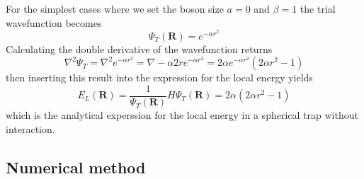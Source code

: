 \documentclass[12pt]{article}
\begin{document}
  For the simplest cases where we set the boson size $a = 0$ and $\beta = 1$ the 
  trial wavefunction becomes 
  \begin{equation}
    \Psi_T(\bm{R}) = e^{-\alpha r^2}
    \label{eq:psi1}
  \end{equation}
  Calculating the double derivative of the wavefunction returns
  \begin{equation}
    \nabla^2\Psi_T = \nabla^2 e^{-\alpha r^2} = \nabla -\alpha 2r e^{-\alpha r^2}%
    = 2\alpha e^{-\alpha r^2}(2\alpha r^2-1)
  \end{equation}
  then inserting this result into the expression for the local energy yields
  \begin{equation}
    E_L(\bm{R}) = \frac{1}{\Psi_T(\bm{R})}H\Psi_T(\bm{R}) = 2\alpha(2\alpha r^2-1)
  \end{equation}
  which is the analytical experssion for the local energy in a spherical trap 
  without interaction.

  \subsection{Numerical method}
\end{document}

